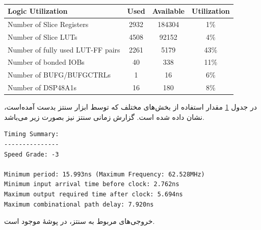 \documentclass[conference]{IEEEtran-ModifiedForMVIP}
\begin{document}
\begin{latin}
\begin{table}[t]
\centering
\scriptsize
\caption{}
\begin{tabular}[t]{|l|l|c|c|c|}
\hline
\multicolumn{2}{|l|}{Logic Utilization}                 & Used       & Available       & Utilization       \\ \hline
\multicolumn{2}{|l|}{Number of Slice Registers}         & 2932       & 184304          & 1\%               \\ \hline
\multicolumn{2}{|l|}{Number of Slice LUTs}              & 4508       & 92152           & 4\%               \\ \hline
\multicolumn{2}{|l|}{Number of fully used LUT-FF pairs} & 2261       & 5179            & 43\%              \\ \hline
\multicolumn{2}{|l|}{Number of bonded IOBs}             & 40         & 338             & 11\%              \\ \hline
\multicolumn{2}{|l|}{Number of BUFG/BUFGCTRLs}          & 1          & 16              & 6\%               \\ \hline
\multicolumn{2}{|l|}{Number of DSP48A1s}                & 16         & 180             & 8\%               \\ \hline
\end{tabular}
\label{tab:DeviceUtilSummary}
\end{table}
\end{latin}

در جدول
\ref{tab:DeviceUtilSummary}
مقدار استفاده از بخش‌های مختلف
که توسط ابزار سنتز بدست آمده‌است، نشان داده شده است. گزارش زمانی سنتز نیز بصورت زیر می‌باشد.

\begin{latin}
\begin{lstlisting}
Timing Summary:
---------------
Speed Grade: -3

Minimum period: 15.993ns (Maximum Frequency: 62.528MHz)
Minimum input arrival time before clock: 2.762ns
Maximum output required time after clock: 5.694ns
Maximum combinational path delay: 7.920ns
\end{lstlisting}
\end{latin}

خروجی‌های مربوط به سنتز، در پوشهٔ
موجود است.
\end{document}
